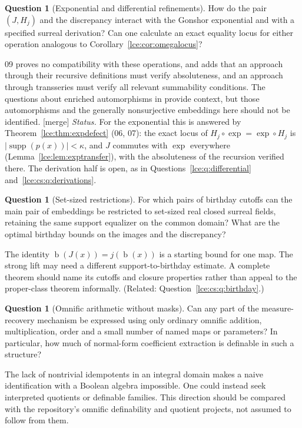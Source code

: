 \documentclass[11pt,letterpaper]{article}
\numberwithin{equation}{section}
\theoremstyle{definition}
\newtheorem{question}[theorem]{Question}
\theoremstyle{remark}
\newcommand{\supp}{\operatorname{supp}}
\newcommand{\bd}{\operatorname{b}}
\newcommand{\abs}[1]{\lvert#1\rvert}
\newcommand{\thref}[1]{Theorem~\ref{#1}}
\newcommand{\leref}[1]{Lemma~\ref{#1}}
\newcommand{\mergetag}{\textup{\textsf{\small[merge]}}}%
\begin{document}
\begin{question}[Exponential and differential refinements]\label{lce:sg:q:exp}
How do the pair $(J,H_j)$ and the discrepancy interact with the Gonshor
exponential and with a specified surreal derivation? Can one calculate an
exact equality locus for either operation analogous to
Corollary~\ref{lce:cor:omegalocus}?
\end{question}
09 proves no compatibility with these operations, and adds that an approach
through their recursive definitions must verify absoluteness, and an
approach through transseries must verify all relevant summability
conditions. The questions about enriched automorphisms in \cite{KKS} provide
context, but those automorphisms and the generally nonsurjective embeddings
here should not be identified. \mergetag{} \emph{Status.} For the
exponential this is answered by \thref{lce:thm:expdefect} (06, 07): the
exact locus of $H_j\circ\exp=\exp\circ H_j$ is
$\abs{\supp(p(x))}<\kappa$, and $J$ commutes with $\exp$ everywhere
(\leref{lce:lem:exptransfer}), with the absoluteness of the recursion
verified there. The derivation half is open, as in
Questions~\ref{lce:q:differential} and~\ref{lce:cs:q:derivations}.

\begin{question}[Set-sized restrictions]\label{lce:sg:q:setsized}
For which pairs of birthday cutoffs can the main pair of embeddings be
restricted to set-sized real closed surreal fields, retaining the same
support equalizer on the common domain? What are the optimal birthday
bounds on the images and the discrepancy?
\end{question}
The identity $\bd(J(x))=j(\bd(x))$ is a starting bound for one map. The
strong lift may need a different support-to-birthday estimate. A complete
theorem should name its cutoffs and closure properties rather than appeal
to the proper-class theorem informally. (Related:
Question~\ref{lce:cs:q:birthday}.)

\begin{question}[Omnific arithmetic without masks]\label{lce:sg:q:masks}
Can any part of the measure-recovery mechanism be expressed using only
ordinary omnific addition, multiplication, order and a small number of
named maps or parameters? In particular, how much of normal-form
coefficient extraction is definable in such a structure?
\end{question}
The lack of nontrivial idempotents in an integral domain makes a naive
identification with a Boolean algebra impossible. One could instead seek
interpreted quotients or definable families. This direction should be
compared with the repository's omnific definability and quotient projects,
not assumed to follow from them.
\end{document}
